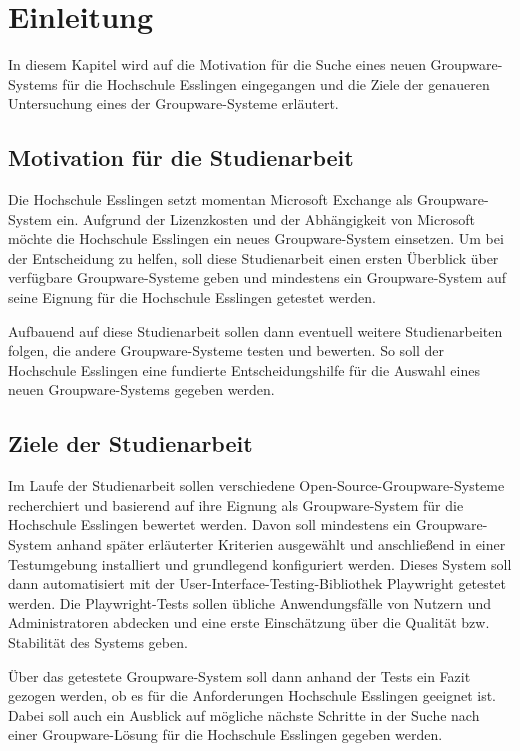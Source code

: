 
\chapter{Einleitung}

In diesem Kapitel wird auf die Motivation für die Suche eines neuen Groupware-Systems für die Hochschule Esslingen eingegangen und die Ziele der genaueren Untersuchung eines der Groupware-Systeme erläutert.


\section{Motivation für die Studienarbeit}

Die Hochschule Esslingen setzt momentan Microsoft Exchange als Groupware-System ein.
Aufgrund der Lizenzkosten und der Abhängigkeit von Microsoft möchte die Hochschule Esslingen ein neues Groupware-System einsetzen.
Um bei der Entscheidung zu helfen, soll diese Studienarbeit einen ersten Überblick über verfügbare Groupware-Systeme geben und mindestens ein Groupware-System auf seine Eignung für die Hochschule Esslingen getestet werden.

Aufbauend auf diese Studienarbeit sollen dann eventuell weitere Studienarbeiten folgen, die andere Groupware-Systeme testen und bewerten.
So soll der Hochschule Esslingen eine fundierte Entscheidungshilfe für die Auswahl eines neuen Groupware-Systems gegeben werden.


\section{Ziele der Studienarbeit}

Im Laufe der Studienarbeit sollen verschiedene Open-Source-Groupware-Systeme recherchiert und basierend auf ihre Eignung als Groupware-System für die Hochschule Esslingen bewertet werden.
Davon soll mindestens ein Groupware-System anhand später erläuterter Kriterien ausgewählt und anschließend in einer Testumgebung installiert und grundlegend konfiguriert werden.
Dieses System soll dann automatisiert mit der User-Interface-Testing-Bibliothek Playwright getestet werden.
Die Playwright-Tests sollen übliche Anwendungsfälle von Nutzern und Administratoren abdecken und eine erste Einschätzung über die Qualität bzw. Stabilität des Systems geben.

Über das getestete Groupware-System soll dann anhand der Tests ein Fazit gezogen werden, ob es für die Anforderungen Hochschule Esslingen geeignet ist.
Dabei soll auch ein Ausblick auf mögliche nächste Schritte in der Suche nach einer Groupware-Lösung für die Hochschule Esslingen gegeben werden.



